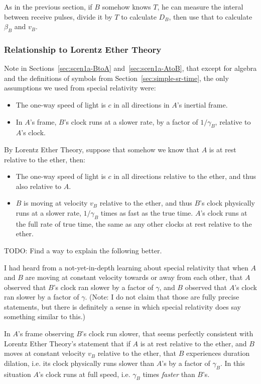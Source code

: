 \documentclass[a4paper]{article}
\theoremstyle{plain}
\theoremstyle{definition}
\begin{document}
As in the previous section, if $B$ somehow knows $T$,
he can measure the interal between receive pulses,
divide it by $T$ to calculate $D_B$,
then use that to calculate $\beta_B$ and $v_B$.


\subsubsection{Relationship to Lorentz Ether Theory}
\label{sec:scen1a-LET}

Note in Sections~\ref{sec:scen1a-BtoA} and~\ref{sec:scen1a-AtoB}, that
except for algebra and the definitions of symbols from
Section~\ref{sec:simple-sr-time}, the only assumptions we used from special relativity were:
\begin{itemize}
\item The one-way speed of light is $c$ in all directions in $A$'s
  inertial frame.
\item In $A$'s frame, $B$'s clock runs at a slower rate, by a factor
  of $1/\gamma_B$, relative to $A$'s clock.
\end{itemize}
By Lorentz Ether Theory, suppose that somehow we know that $A$ is at
rest relative to the ether, then:
\begin{itemize}
\item The one-way speed of light is $c$ in all directions relative to
  the ether, and thus also relative to $A$.
\item $B$ is moving at velocity $v_B$ relative to the ether, and thus
  $B$'s clock physically runs at a slower rate, $1/\gamma_B$ times as
  fast as the true time.  $A$'s clock runs at the full rate of true
  time, the same as any other clocks at rest relative to the ether.
\end{itemize}

TODO: Find a way to explain the following better.

I had heard from a not-yet-in-depth learning about special relativity
that when $A$ and $B$ are moving at constant velocity towards or away
from each other, that $A$ observed that $B$'s clock ran slower by a
factor of $\gamma$, and $B$ observed that $A$'s clock ran slower by a
factor of $\gamma$.  (Note: I do not claim that those are fully
precise statements, but there is definitely a sense in which special
relativity does say something similar to this.)

In $A$'s frame observing $B$'s clock run slower, that seems perfectly
consistent with Lorentz Ether Theory's statement that if $A$ is at
rest relative to the ether, and $B$ moves at constant velocity $v_B$
relative to the ether, that $B$ experiences duration dilation,
i.e. its clock physically runs slower than $A$'s by a factor of
$\gamma_B$.  In this situation $A$'s clock runs at full speed,
i.e. $\gamma_B$ times {\em faster} than $B$'s.
\end{document}

